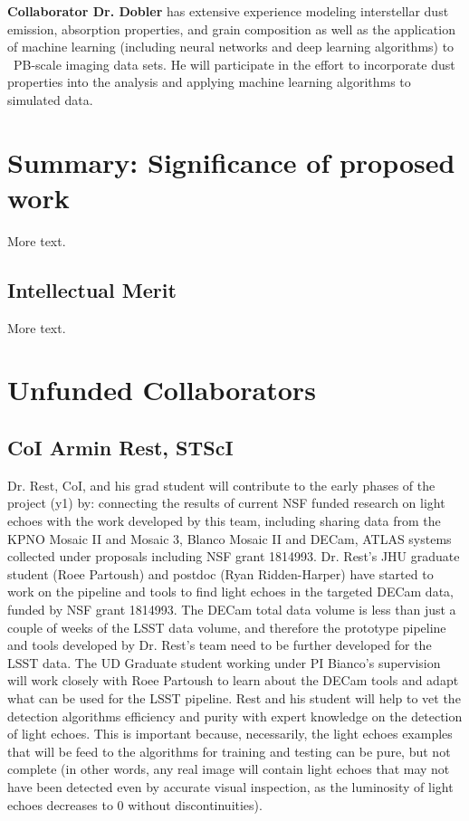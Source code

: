 \documentclass{proposalnsf}
\begin{document}
{\bf Collaborator Dr. Dobler} has extensive experience modeling interstellar dust emission, absorption properties, and grain composition as well as the application of machine learning (including neural networks and deep learning algorithms) to ~PB-scale imaging data sets. He will participate in the effort to incorporate dust properties into the analysis and applying machine learning algorithms to simulated data.






\section{Summary: Significance of proposed work}

More text.

\subsection{Intellectual Merit}

More text.
\section{Unfunded Collaborators}

\subsection{CoI Armin Rest, STScI}

Dr. Rest, CoI, and his grad student will contribute to the early phases of the project (y1) by: connecting the results of current NSF funded research on light echoes with the work developed by this team, including sharing data from the KPNO Mosaic II and Mosaic 3, Blanco Mosaic II and DECam, ATLAS systems collected under proposals including NSF grant 1814993. Dr. Rest’s JHU graduate student (Roee Partoush) and postdoc (Ryan Ridden-Harper) have started to work on the pipeline and tools to find light echoes in the targeted DECam data, funded by NSF grant 1814993. The DECam total data volume is less than just a couple of weeks of the LSST data volume, and therefore the prototype pipeline and tools developed by Dr. Rest’s team need to be further developed for the LSST data. The UD Graduate student working under PI Bianco’s supervision will work closely with Roee Partoush to learn about the DECam tools and adapt what can be used for the LSST pipeline. Rest and his student will help to vet the detection algorithms efficiency and purity with expert knowledge on the detection of light echoes. This is important because, necessarily, the light echoes examples that will be feed to the algorithms  for training and testing can be pure, but not complete (in other words, any real image will contain light echoes that may not have been detected even by accurate visual inspection, as the luminosity of light echoes decreases to 0 without discontinuities).
\end{document}
